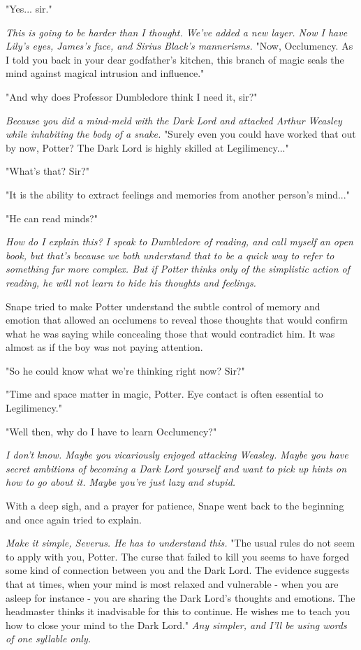 \documentclass[a4paper,11pt]{article}
\begin{document}
"Yes... sir."

\emph{This is going to be harder than I thought. We've added a new layer. Now I have Lily's eyes, James's face, and Sirius Black's mannerisms.} "Now, Occlumency. As I told you back in your dear godfather's kitchen, this branch of magic seals the mind against magical intrusion and influence."

"And why does Professor Dumbledore think I need it, sir?"

\emph{Because you did a mind-meld with the Dark Lord and attacked Arthur Weasley while inhabiting the body of a snake.} "Surely even you could have worked that out by now, Potter? The Dark Lord is highly skilled at Legilimency..."

"What's that? Sir?"

"It is the ability to extract feelings and memories from another person's mind..."

"He can read minds?"

\emph{How do I explain this? I speak to Dumbledore of reading, and call myself an open book, but that's because we both understand that to be a quick way to refer to something far more complex. But if Potter thinks only of the simplistic action of reading, he will not learn to hide his thoughts and feelings.}

Snape tried to make Potter understand the subtle control of memory and emotion that allowed an occlumens to reveal those thoughts that would confirm what he was saying while concealing those that would contradict him. It was almost as if the boy was not paying attention.

"So he could know what we're thinking right now? Sir?"

"Time and space matter in magic, Potter. Eye contact is often essential to Legilimency."

"Well then, why do I have to learn Occlumency?"

\emph{I don't know. Maybe you vicariously enjoyed attacking Weasley. Maybe you have secret ambitions of becoming a Dark Lord yourself and want to pick up hints on how to go about it. Maybe you're just lazy and stupid.}

With a deep sigh, and a prayer for patience, Snape went back to the beginning and once again tried to explain.

\emph{Make it simple, Severus. He has to understand this.} "The usual rules do not seem to apply with you, Potter. The curse that failed to kill you seems to have forged some kind of connection between you and the Dark Lord. The evidence suggests that at times, when your mind is most relaxed and vulnerable - when you are asleep for instance - you are sharing the Dark Lord's thoughts and emotions. The headmaster thinks it inadvisable for this to continue. He wishes me to teach you how to close your mind to the Dark Lord." \emph{Any simpler, and I'll be using words of one syllable only.}
\end{document}
